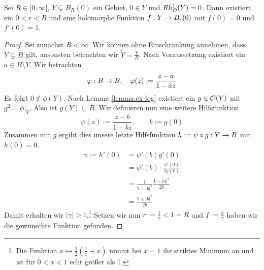\begin{lemma}
  \label{lemma:bihol-kreis}
  Sei $R \in ]0, \infty]$, $Y \subsetneq B_R(0)$ ein Gebiet, $0 \in Y$
  und $Rh_{\mathcal{O}}^1(Y) = 0$. 
  Dann existiert ein $0< r <R$ und eine holomorphe Funktion $f: Y \rightarrow B_r(0)$ mit $f(0) =
  0$ und $f'(0) = 1$.
\end{lemma}

\begin{proof}
  Sei zunächst $R < \infty$. Wir können ohne Einschränkung annehmen,
  dass $Y \subsetneq B$ gilt, ansonsten betrachten wir $\tilde Y =
  \frac{Y}{R}$. Nach Voraussetzung existiert ein $a \in B \setminus
  Y$. Wir betrachten
  \[
  \varphi: B \rightarrow B, \quad \varphi(z) := \frac{z-a}{1-\bar a z}
  \]
  Es folgt $0 \notin \phi(Y)$. Nach Lemma \ref{lemma:ex-log} existiert ein
  $g \in \mathcal{O}(Y)$ mit $g^2 = \phi|_Y$. Also ist $g(Y) \subseteq
  B$. Wir definieren nun eine weitere Hilfsfunktion
  \[
  \psi(z) := \frac{z-b}{1 - \bar b z}, \qquad b:= g(0)
  \]
  Zusammen mit $g$ ergibt dies unsere letzte Hilfsfunktion $h :=
  \psi \circ g: Y \rightarrow B$ mit $h(0) = 0$.
  \begin{align*}
    \gamma := h'(0) & = \psi'(b) g'(0) \\
    & = \psi'(b) \cdot \frac{\phi'(0)}{2 g(0)} \\
    & = \frac{1}{1-|b|^2} \frac{1-|a|^2}{2b} \\
    & = \frac{1 + |b|^2}{2b}
  \end{align*}
  Damit erhalten wir $|\gamma| > 1$.\footnote{Die Funktion $x \mapsto
    \frac12 \left ( \frac1x + x \right )$ nimmt bei $x = 1$ ihr
    striktes Minimum an und ist für $0 < x< 1$ echt größer als 1.} Setzen
  wir nun $r := \frac{1}{\gamma} < 1 = R$ und $f :=
  \frac{h}{\gamma}$ haben wir die gewünschte Funktion gefunden.


\end{proof}
